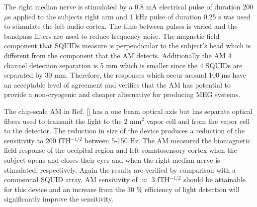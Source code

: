 The right median nerve is stimulated by a 0.8 mA electrical pulse of duration 200 $\mu$s applied to the subjects right arm and 1 kHz pulse of duration 0.25 s was used to stimulate the left audio cortex. The time between pulses is varied and the bandpass filters are used to reduce frequency noise. The magnetic field component that SQUIDs measure is perpendicular to the subject's head which is different from the component that the AM detects. Additionally the AM 4 channel detection separation is 5 mm which is smaller since the 4 SQUIDs are separated by 30 mm. Therefore, the responses which occur around 100 ms have an acceptable level of agreement and verifies that the AM has potential to provide a non-cryogenic and cheaper alternative for producing MEG systems.  

The chip-scale AM in Ref. [] has a one beam optical axis but has separate optical fibers used to transmit the light to the 2 mm$^{2}$ vapor cell and from the vapor cell to the detector. The reduction in size of the device produces a reduction of the sensitivity to 200 fTH$^{-1/2}$ between 5-150 Hz. The AM measured the biomagnetic field response of the occipital region and left somatosensory cortex when the subject opens and closes their eyes and when the right median nerve is stimulated, respectively. Again the results are verified by comparison with a commercial SQUID array. AM sensitivity of $\approx$ 3 fTH$^{-1/2}$ should be attainable for this device and an increase from the 30 $\%$ efficiency of light detection will significantly improve the sensitivity. 

